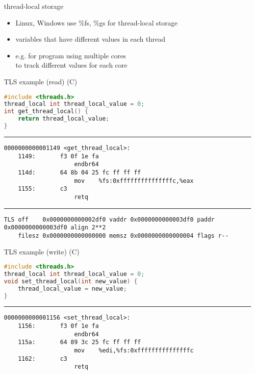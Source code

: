 \begin{frame}{thread-local storage}
    \begin{itemize}
    \item Linux, Windows use \%fs, \%gs for thread-local storage
    \vspace{.5cm}
    \item variables that have different values in each thread
    \item e.g. for program using multiple cores \\ 
          to track different values for each core
    \end{itemize}
\end{frame}

\begin{frame}[fragile,label=tlsExample1]{TLS example (read) (C)}
\begin{lstlisting}[language=C]
#include <threads.h>
thread_local int thread_local_value = 0;
int get_thread_local() {
    return thread_local_value;
}
\end{lstlisting}
\hrule
\begin{Verbatim}[fontsize=\small]
0000000000001149 <get_thread_local>:
    1149:       f3 0f 1e fa             
                    endbr64 
    114d:       64 8b 04 25 fc ff ff ff
                    mov    %fs:0xfffffffffffffffc,%eax
    1155:       c3  
                    retq   
\end{Verbatim}
\hrule
\begin{Verbatim}[fontsize=\fontsize{9}{10}\selectfont]
TLS off    0x0000000000002df0 vaddr 0x0000000000003df0 paddr 0x0000000000003df0 align 2**2
    filesz 0x0000000000000000 memsz 0x0000000000000004 flags r--
\end{Verbatim}
\end{frame}

\begin{frame}[fragile,label=tlsExample2]{TLS example (write) (C)}
\begin{lstlisting}[language=C]
#include <threads.h>
thread_local int thread_local_value = 0;
void set_thread_local(int new_value) {
    thread_local_value = new_value;
}
\end{lstlisting}
\hrule
\begin{Verbatim}[fontsize=\fontsize{10}{11}\selectfont]
0000000000001156 <set_thread_local>:
    1156:       f3 0f 1e fa 
                    endbr64 
    115a:       64 89 3c 25 fc ff ff ff
                    mov    %edi,%fs:0xfffffffffffffffc
    1162:       c3
                    retq
\end{Verbatim}
\end{frame}

